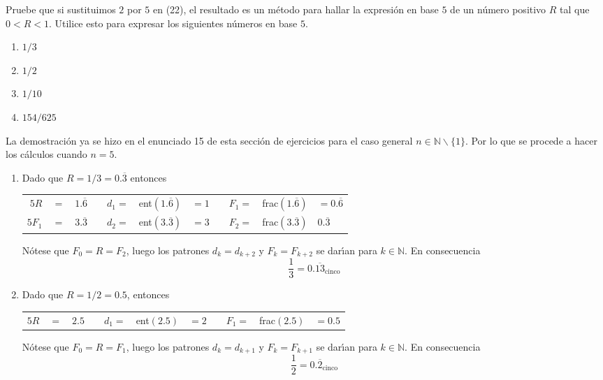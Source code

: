 \begin{enunciado}
 Pruebe que si sustituimos $2$ por $5$ en (22), el resultado es un m\'etodo para hallar la expresi\'on en base $5$ de un n\'umero positivo $R$ tal que $0 < R < 1$. Utilice esto para expresar los siguientes n\'umeros en base $5$.
 \begin{multicols}{4}
  \begin{enumerate}
   \item $1/3$
   \item $1/2$
   \item $1/10$
   \item $154/625$
  \end{enumerate}
 \end{multicols}
\end{enunciado}

\begin{solucion}
 La demostraci\'on ya se hizo en el enunciado 15 de esta secci\'on de ejercicios para el caso general $n \in \mathbb{N}\backslash\{1\}$. Por lo que se procede a hacer los c\'alculos cuando $n=5$.
 \begin{enumerate}
  \item Dado que $R = 1/3 = 0.\overline{3}$ entonces 
  \begin{center}
   \begin{tabular}{rclcrclcrcl}
    $5R$ & $=$ & $1.\overline{6}$ & \hspace{1.5cm} & $d_1 =$ & ent$(1.\overline{6})$ & $=1$ & \hspace{1.5cm} & $F_1=$ & frac$(1.\overline{6})$ & $=0.\overline{6}$ \\
    $5F_1$ & $=$ & $3.\overline{3}$ & & $d_2 =$ & ent$(3.\overline{3})$ & $=3$ & & $F_2 =$ & frac$(3.\overline{3})$ & $0.\overline{3}$
   \end{tabular}
  \end{center}
  N\'otese que $F_0 = R = F_2$, luego los patrones $d_k = d_{k+2}$ y $F_k = F_{k+2}$ se dar\'{\i}an para $k\in\mathbb{N}$. En consecuencia
  \begin{equation*}
   \frac{1}{3} = 0.\overline{13}_{\text{cinco}}
  \end{equation*}

  \item Dado que $R = 1/2 = 0.5$, entonces
  \begin{center}
   \begin{tabular}{rclcrclcrcl}
    $5R$ & $=$ & $2.5$ & \hspace{1.5cm} & $d_1 =$ & ent$(2.5)$ & $=2$ & \hspace{1.5cm} & $F_1=$ & frac$(2.5)$ & $=0.5$
   \end{tabular}
  \end{center}
  N\'otese que $F_0 = R = F_1$, luego los patrones $d_k = d_{k+1}$ y $F_k = F_{k+1}$ se dar\'{\i}an para $k\in\mathbb{N}$. En consecuencia
  \begin{equation*}
   \frac{1}{2} = 0.\overline{2}_{\text{cinco}}
  \end{equation*}


\end{enumerate}
\end{solucion}
